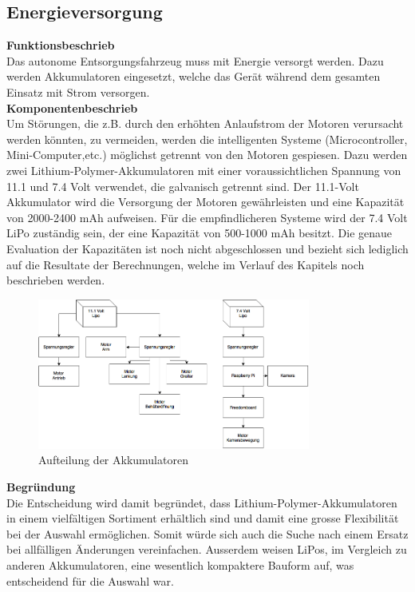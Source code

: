 \subsection{Energieversorgung}
%
\textbf{Funktionsbeschrieb}\\[0.2cm]
Das autonome Entsorgungsfahrzeug muss mit Energie versorgt werden. Dazu werden Akkumulatoren eingesetzt, welche das Gerät während dem gesamten Einsatz mit Strom versorgen. 
\\[0.2cm]
\textbf{Komponentenbeschrieb}\\[0.2cm]
Um Störungen, die z.B. durch den erhöhten Anlaufstrom der Motoren verursacht werden könnten, zu vermeiden, werden die intelligenten Systeme (Microcontroller, Mini-Computer,etc.) möglichst getrennt von den Motoren gespiesen. Dazu werden zwei Lithium-Polymer-Akkumulatoren mit einer voraussichtlichen Spannung von 11.1 und 7.4 Volt verwendet, die galvanisch getrennt sind.
Der 11.1-Volt Akkumulator wird die Versorgung der Motoren gewährleisten und eine Kapazität von 2000-2400 mAh aufweisen. Für die empfindlicheren Systeme wird der 7.4 Volt LiPo zuständig sein, der eine Kapazität von 500-1000 mAh besitzt.
Die genaue Evaluation der Kapazitäten ist noch nicht abgeschlossen und bezieht sich lediglich auf die Resultate der Berechnungen, welche im Verlauf des Kapitels noch beschrieben werden.
\begin{figure}[H]
\centering
\includegraphics[width=0.8\textwidth]{03_Loesungskonzept/pictures/speisung.png}
\caption{Aufteilung der Akkumulatoren}	
\end{figure}\flushleft
\textbf{Begründung}\\[0.2cm]
Die Entscheidung wird damit begründet, dass Lithium-Polymer-Akkumulatoren in einem vielfältigen Sortiment erhältlich sind und damit eine grosse Flexibilität bei der Auswahl ermöglichen. Somit würde sich auch die Suche nach einem Ersatz bei allfälligen Änderungen vereinfachen. Ausserdem weisen LiPos, im Vergleich zu anderen Akkumulatoren, eine wesentlich kompaktere Bauform auf, was entscheidend für die Auswahl war. \\[0.2cm]
